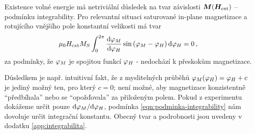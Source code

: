 Existence volné energie má netriviální důsledek na tvar závislosti $\bm{M}(\bm{H}_\textrm{ext})$ --\tododash podmínku integrability.
Pro relevantní situaci saturované in-plane magnetizace a rotujícího vnějšího pole konstantní velikosti má tvar
\begin{equation} \label{eqn:podminka-integrability}
    \mu_0H_\textrm{ext} M_S \int_{0}^{2\pi}  \frac{\text{d}\varphi_M}{\text{d}\varphi_H} \sin\left(\varphi_M-\varphi_H\right) \text{d}\varphi_H=0 \,,
\end{equation}
za podmínky, že $\varphi_M$ je spojitou funkcí $\varphi_H$ - nedochází k přeskokům magnetizace.

Důsledkem je např. intuitivní fakt, že z myslitelných průběhů $\varphi_M(\varphi_H)=\varphi_H+c$ je jediný možný ten, pro který $c=0$;
není možné, aby magnetizace konzistentně ``předbíhala'' nebo se ``opožďovala'' za přiloženým polem.
Pokud z experimentu dokážeme určit pouze $\text{d}\varphi_M/\text{d}\varphi_H$, podmínka \eqref{eqn:podminka-integrability} nám dovoluje určit integrační konstantu.
Obecný tvar a podrobnosti jsou uvedeny v dodatku \ref{app:integrabilita}.
